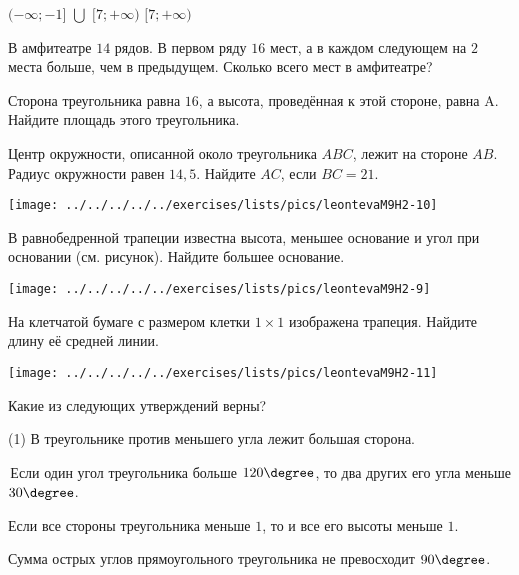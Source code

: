 \begin{homework}[number=1]
\begin{listofex}
\begin{tasks}
			\task \( (-\infty;-1] \) \( \bigcup \) \( [7;+\infty) \)
			\task \( [7;+\infty) \)
		\end{tasks}
		\item В амфитеатре \( 14 \) рядов. В первом ряду \( 16 \) мест, а в каждом следующем на \( 2  \) места
		больше, чем в предыдущем. Сколько всего мест в амфитеатре?
		\item Сторона треугольника равна \( 16 \), а высота, проведённая к этой стороне, равна A.
		Найдите площадь этого треугольника.
		\item 
		\begin{minipage}[t]{\bodywidth}
			Центр окружности, описанной около треугольника \( ABC \), лежит на стороне \( AB \). Радиус окружности равен \( 14,5 \). Найдите \( AC \), если \( BC = 21 \).
		\end{minipage}
		\hspace{0.02\linewidth}
		\begin{minipage}[t]{\picwidth}
			\texttt{[image: ../../../../../exercises/lists/pics/leontevaM9H2-10]}
		\end{minipage}
		\item 
		\begin{minipage}[t]{\bodywidth}
			В равнобедренной трапеции известна высота, меньшее основание и угол при
		основании (см. рисунок). Найдите большее основание.
		\end{minipage}
		\hspace{0.02\linewidth}
		\begin{minipage}[t]{\picwidth}
			\texttt{[image: ../../../../../exercises/lists/pics/leontevaM9H2-9]}
		\end{minipage}
		\item 
		\begin{minipage}[t]{\bodywidth}
			 На клетчатой бумаге с размером клетки \(  1\times 1 \) изображена трапеция. Найдите
		длину её средней линии.
		\end{minipage}
		\hspace{0.02\linewidth}
		\begin{minipage}[t]{\picwidth}
			\texttt{[image: ../../../../../exercises/lists/pics/leontevaM9H2-11]}
		\end{minipage}
		\item Какие из следующих утверждений верны? \begin{tasks}(1)
			\task В треугольнике против меньшего угла лежит большая сторона.
			
			\task Если один угол треугольника больше \( 120\degree \), то два других его угла меньше \( 30\degree \).
			
			\task Если все стороны треугольника меньше \( 1 \), то и все его высоты меньше \(  1 \).
			
			\task Сумма острых углов прямоугольного треугольника не превосходит \( 90\degree \).
		\end{tasks}
	\end{listofex}
\end{homework}

